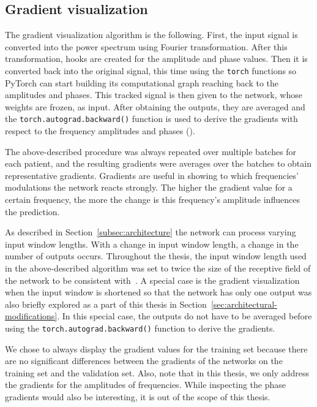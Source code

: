 \subsection{Gradient visualization}\label{subsec:gradinet-visualization}
The gradient visualization algorithm is the following.
First, the input signal is converted into the power spectrum using Fourier transformation.
After this transformation, hooks are created for the amplitude and phase values.
Then it is converted back into the original signal, this time using the \texttt{torch} functions so PyTorch can start building its computational graph reaching back to the amplitudes and phases.
This tracked signal is then given to the network, whose weights are frozen, as input.
After obtaining the outputs, they are averaged and the \texttt{torch.autograd.backward()} function is used to derive the gradients with respect to the frequency amplitudes and phases (\cite{gradient-visualization}).

The above-described procedure was always repeated over multiple batches for each patient, and the resulting gradients were averages over the batches to obtain representative gradients.
Gradients are useful in showing to which frequencies' modulations the network reacts strongly.
The higher the gradient value for a certain frequency, the more the change is this frequency's amplitude influences the prediction.

As described in Section~\ref{subsec:architecture} the network can process varying input window lengths. With a change in input window length, a change in the number of outputs occurs.
Throughout the thesis, the input window length used in the above-described algorithm was set to twice the size of the receptive field of the network to be consistent with~\cite{Hammer-2021}.
A special case is the gradient visualization when the input window is shortened so that the network has only one output was also briefly explored as a part of this thesis in Section~\ref{sec:architectural-modifications}.
In this special case, the outputs do not have to be averaged before using the \texttt{torch.autograd.backward()} function to derive the gradients. 
 
We chose to always display the gradient values for the training set because there are no significant differences between the gradients of the networks on the training set and the validation set.
Also, note that in this thesis, we only address the gradients for the amplitudes of frequencies.
While inspecting the phase gradients would also be interesting, it is out of the scope of this thesis.

